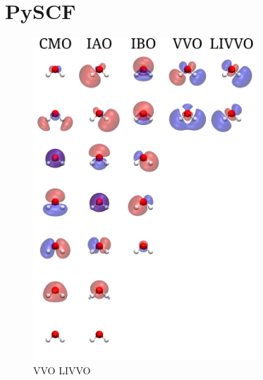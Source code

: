 \section{PySCF}
\begin{figure}[t]
    \centering
    \includegraphics[width=0.75\textwidth]{Images/appendix1/vvolivvo_smaller_whitebg.png}
    \caption{VVO LIVVO}
    \label{img:vvlivvo}
\end{figure}
